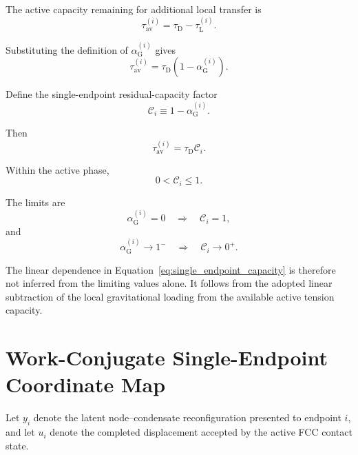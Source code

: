 The active capacity remaining for additional local transfer is
\begin{equation}
    \tau_{\mathrm{av}}^{(i)} = \tau_{\mathrm{D}}-\tau_{\mathrm{L}}^{(i)}.
\end{equation}

Substituting the definition of $\alpha_{\mathrm{G}}^{(i)}$ gives
\begin{equation}
    \tau_{\mathrm{av}}^{(i)} = \tau_{\mathrm{D}} \left( 1-\alpha_{\mathrm{G}}^{(i)} \right).
\end{equation}

Define the single-endpoint residual-capacity factor
\begin{equation}
    \mathcal{C}_{i} \equiv 1-\alpha_{\mathrm{G}}^{(i)}.
    \label{eq:single_endpoint_capacity}
\end{equation}

Then
\begin{equation}
    \tau_{\mathrm{av}}^{(i)} = \tau_{\mathrm{D}}\mathcal{C}_{i}.
\end{equation}

Within the active phase,
\begin{equation}
    0 < \mathcal{C}_{i} \leq 1.
\end{equation}

The limits are
\begin{equation}
    \alpha_{\mathrm{G}}^{(i)} = 0 \quad\Longrightarrow\quad \mathcal{C}_{i} = 1,
\end{equation}
and
\begin{equation}
    \alpha_{\mathrm{G}}^{(i)} \rightarrow 1^{-} \quad\Longrightarrow\quad \mathcal{C}_{i} \rightarrow 0^{+}.
\end{equation}

The linear dependence in Equation~\eqref{eq:single_endpoint_capacity} is therefore not inferred from the limiting values alone. It follows from the adopted linear subtraction of the local gravitational loading from the available active tension capacity.

\section{Work-Conjugate Single-Endpoint Coordinate Map}
\label{sec:grav_work_conjugate_endpoint}

Let $y_{i}$ denote the latent node--condensate reconfiguration presented to endpoint $i$, and let $u_{i}$ denote the completed displacement accepted by the active FCC contact state.


